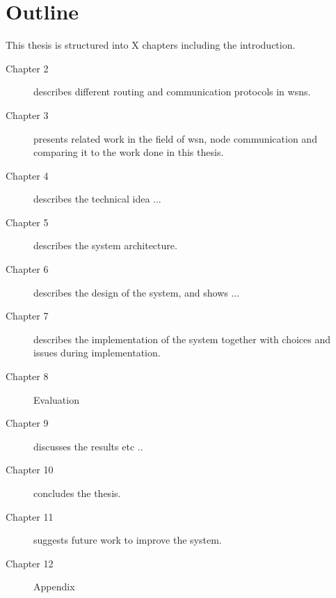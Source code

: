 \documentclass[USenglish]{uit-thesis}
\begin{document}
\section{Outline}
This thesis is structured into X chapters including the introduction.

\begin{description}
\item[Chapter 2] describes different routing and communication protocols in \gls{wsn}s.
\item[Chapter 3] presents related work in the field of \gls{wsn}, node communication and comparing it to the work done in this thesis.
\item[Chapter 4] describes the technical idea ...
\item[Chapter 5] describes the system architecture.
\item[Chapter 6] describes the design of the system, and shows ...
\item[Chapter 7] describes the implementation of the system together with choices and issues during implementation.
\item[Chapter 8] Evaluation
\item[Chapter 9] discusses the results etc ..
\item[Chapter 10] concludes the thesis.
\item[Chapter 11] suggests future work to improve the system.
\item[Chapter 12] Appendix
\end{description}







\end{document}
